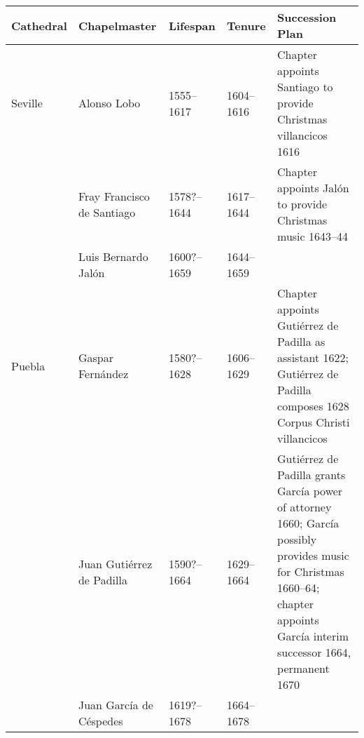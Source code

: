 \documentclass{tex/vcbook-float}
\begin{document}
\renewcommand{\arraystretch}{1.5}
\begin{tabulary}{\textwidth}{llllL}
    \toprule
    Cathedral & Chapelmaster & Lifespan & Tenure & Succession Plan\\
    \midrule

    Seville & Alonso Lobo & 1555--1617 & 1604--1616 
    & Chapter appoints Santiago to provide Christmas villancicos 1616\\

    & Fray Francisco de Santiago & 1578?--1644 & 1617--1644
    & Chapter appoints Jalón to provide Christmas music 1643--44\\

    & Luis Bernardo Jalón & 1600?--1659 & 1644--1659 & \\\midrule
    
    Puebla & Gaspar Fernández & 1580?--1628 & 1606--1629
    & Chapter appoints Gutiérrez de Padilla as assistant 1622; Gutiérrez de
    Padilla composes 1628 Corpus Christi villancicos\\

    & Juan Gutiérrez de Padilla & 1590?--1664 & 1629--1664 
    & Gutiérrez de Padilla grants García power of attorney 1660; García
    possibly provides music for Christmas 1660--64; chapter appoints García
    interim successor 1664, permanent 1670\\

    & Juan García de Céspedes & 1619?--1678 & 1664--1678 & \\
    \bottomrule
\end{tabulary}
\end{document}
